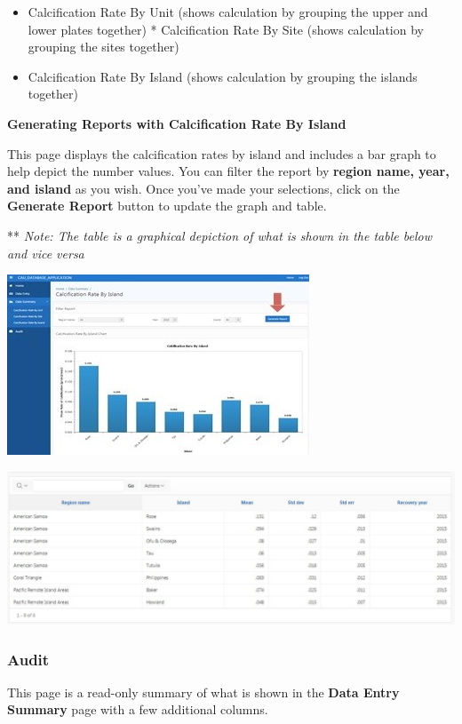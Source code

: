 \documentclass[
]{book}
\providecommand{\tightlist}{%
  \setlength{\itemsep}{0pt}\setlength{\parskip}{0pt}}
\begin{document}
\begin{itemize}
\tightlist
\item
  Calcification Rate By Unit (shows calculation by grouping the upper and lower plates together) * Calcification Rate By Site (shows calculation by grouping the sites together)\\
\item
  Calcification Rate By Island (shows calculation by grouping the islands together)
\end{itemize}

\textbf{Generating Reports with Calcification Rate By Island}

This page displays the calcification rates by island and includes a bar graph to help depict the number values. You can filter the report by \textbf{region name, year, and island} as you wish. Once you've made your selections, click on the \textbf{Generate Report} button to update the graph and table.

** \emph{Note: The table is a graphical depiction of what is shown in the table below and vice versa}

\includegraphics{images/Data8.jpg}

\includegraphics{images/Data9.jpg}

\hypertarget{audit}{%
\subsubsection{Audit}\label{audit}}

This page is a read-only summary of what is shown in the \textbf{Data Entry Summary} page with a few additional columns.
\end{document}
